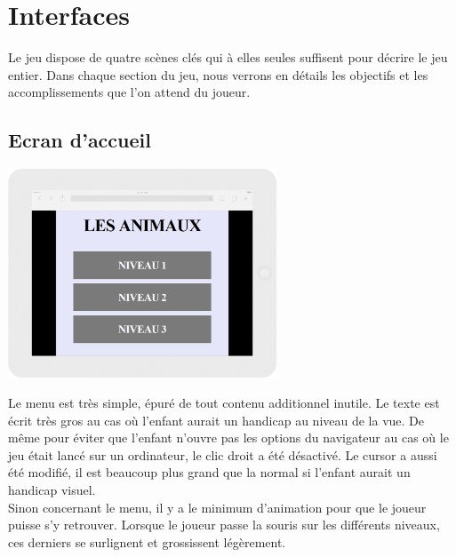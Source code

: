 \documentclass{article}
\begin{document}
\section{Interfaces}
\hspace*{0.6cm}Le jeu dispose de quatre sc\`enes cl\'es qui \`a elles seules suffisent pour d\'ecrire le jeu entier. Dans chaque section du jeu, nous verrons en d\'etails les objectifs et les accomplissements que l'on attend du joueur. 
\subsection{Ecran d'accueil}
\vspace{0.5cm}
\begin{center}
\includegraphics[width=0.6\textwidth]{page1}
\end{center}
\vspace{0.5cm}
\hspace*{0.6cm}Le menu est tr\`es simple, \'epur\'e de tout contenu additionnel inutile. Le texte est \'ecrit tr\`es gros au cas o\`u l'enfant aurait un handicap au niveau de la vue. De m\^eme pour \'eviter que l'enfant n'ouvre pas les options du navigateur au cas o\`u le jeu \'etait lanc\'e sur un ordinateur, le clic droit a \'et\'e d\'esactiv\'e. Le cursor a aussi \'et\'e modifi\'e, il est beaucoup plus grand que la normal si l'enfant aurait un handicap visuel.
\vspace{0.5cm}\\
\hspace*{0.6cm}Sinon concernant le menu, il y a le minimum d'animation pour que le joueur puisse s'y retrouver. Lorsque le joueur passe la souris sur les diff\'erents niveaux, ces derniers se surlignent et grossissent l\'eg\`erement.
\end{document}
